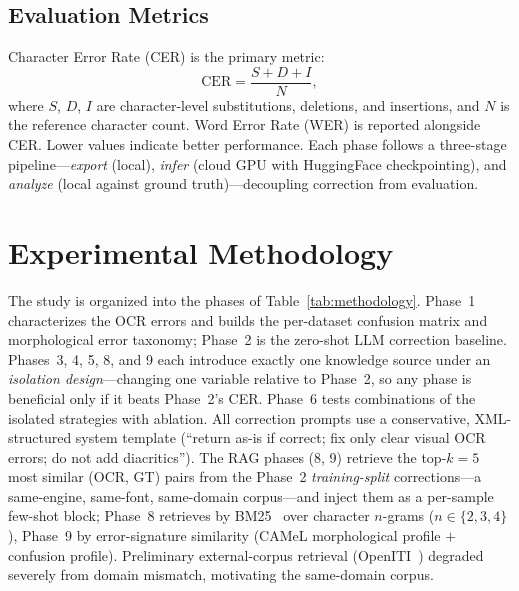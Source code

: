 \documentclass[conference]{IEEEtran}
\begin{document}
\subsection{Evaluation Metrics}
Character Error Rate (CER) is the primary metric:
\begin{equation}
\text{CER} = \frac{S + D + I}{N},
\label{eq:cer}
\end{equation}
where $S$, $D$, $I$ are character-level substitutions, deletions, and
insertions, and $N$ is the reference character count. Word Error Rate (WER) is
reported alongside CER. Lower values indicate better performance. Each phase
follows a three-stage pipeline---\textit{export} (local), \textit{infer}
(cloud GPU with HuggingFace checkpointing), and \textit{analyze} (local against
ground truth)---decoupling correction from evaluation.

\section{Experimental Methodology}

The study is organized into the phases of Table~\ref{tab:methodology}. Phase~1
characterizes the OCR errors and builds the per-dataset confusion matrix and
morphological error taxonomy; Phase~2 is the zero-shot LLM correction baseline.
Phases~3, 4, 5, 8, and 9 each introduce exactly one knowledge source under an
\emph{isolation design}---changing one variable relative to Phase~2, so any
phase is beneficial only if it beats Phase~2's CER. Phase~6 tests combinations
of the isolated strategies with ablation. All correction prompts use a
conservative, XML-structured system template (``return as-is if correct; fix
only clear visual OCR errors; do not add diacritics''). The RAG phases (8, 9)
retrieve the top-$k=5$ most similar (OCR, GT) pairs from the Phase~2
\emph{training-split} corrections---a same-engine, same-font, same-domain
corpus---and inject them as a per-sample few-shot block; Phase~8 retrieves by
BM25~\cite{robertson2009bm25} over character $n$-grams ($n\in\{2,3,4\}$),
Phase~9 by error-signature similarity (CAMeL morphological profile $+$ confusion
profile). Preliminary external-corpus retrieval (OpenITI~\cite{romanov2017openiti})
degraded severely from domain mismatch, motivating the same-domain corpus.
\end{document}

